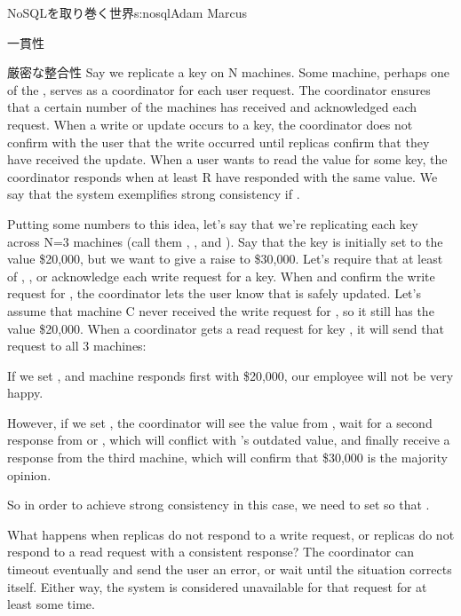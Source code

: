 \begin{aosachapter}{NoSQLを取り巻く世界}{s:nosql}{Adam Marcus}
\begin{aosasect1}{一貫性}
\begin{aosasect2}{厳密な整合性}
Say we replicate a key on N machines.  Some machine, perhaps one of
the , serves as a coordinator for each user request.  The
coordinator ensures that a certain number of the  machines has
received and acknowledged each request.  When a write or update occurs
to a key, the coordinator does not confirm with the user that the
write occurred until  replicas confirm that they have received
the update.  When a user wants to read the value for some key, the
coordinator responds when at least R have responded with the same
value.  We say that the system exemplifies strong consistency if
.

Putting some numbers to this idea, let's say that we're replicating
each key across N=3 machines (call them , , and
).  Say that the key  is initially set
to the value \$20,000, but we want to give  a raise
to \$30,000.  Let's require that at least  of ,
, or  acknowledge each write request for a key.  When
 and  confirm the write request for , the coordinator lets the user know that
 is safely updated.  Let's assume that machine
C never received the write request for , so it
still has the value \$20,000.  When a coordinator gets a read request
for key , it will send that request to all 3
machines:

\begin{aosaitemize}

  \item If we set , and machine  responds first with
  \$20,000, our employee will not be very happy.

  \item However, if we set , the coordinator will see the
  value from , wait for a second response from  or
  , which will conflict with 's outdated value, and
  finally receive a response from the third machine, which will
  confirm that \$30,000 is the majority opinion.

\end{aosaitemize}

So in order to achieve strong consistency in this case, we need to set
 so that .

What happens when  replicas do not respond to a write request,
or  replicas do not respond to a read request with a
consistent response?  The coordinator can timeout eventually and send
the user an error, or wait until the situation corrects itself.
Either way, the system is considered unavailable for that request for
at least some time.


\end{aosasect2}
\end{aosasect1}
\end{aosachapter}
